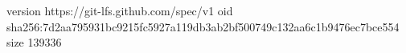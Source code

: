 version https://git-lfs.github.com/spec/v1
oid sha256:7d2aa795931bc9215fc5927a119db3ab2bf500749c132aa6c1b9476ec7bce554
size 139336

